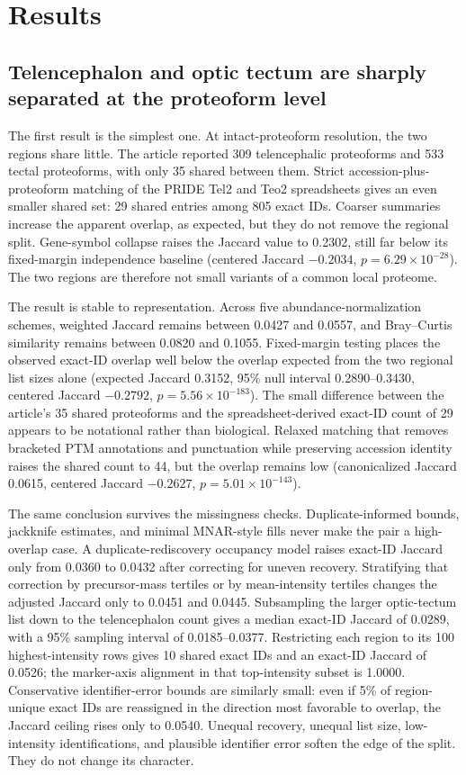 \section{Results}

\subsection{Telencephalon and optic tectum are sharply separated at the proteoform level}

The first result is the simplest one. At intact-proteoform resolution, the two regions share little. The article reported 309 telencephalic proteoforms and 533 tectal proteoforms, with only 35 shared between them. Strict accession-plus-proteoform matching of the PRIDE Tel2 and Teo2 spreadsheets gives an even smaller shared set: 29 shared entries among 805 exact IDs. Coarser summaries increase the apparent overlap, as expected, but they do not remove the regional split. Gene-symbol collapse raises the Jaccard value to 0.2302, still far below its fixed-margin independence baseline (centered Jaccard $-0.2034$, $p = 6.29 \times 10^{-28}$). The two regions are therefore not small variants of a common local proteome.

The result is stable to representation. Across five abundance-normalization schemes, weighted Jaccard remains between 0.0427 and 0.0557, and Bray--Curtis similarity remains between 0.0820 and 0.1055. Fixed-margin testing places the observed exact-ID overlap well below the overlap expected from the two regional list sizes alone (expected Jaccard 0.3152, 95\% null interval 0.2890--0.3430, centered Jaccard $-0.2792$, $p = 5.56 \times 10^{-183}$). The small difference between the article's 35 shared proteoforms and the spreadsheet-derived exact-ID count of 29 appears to be notational rather than biological. Relaxed matching that removes bracketed PTM annotations and punctuation while preserving accession identity raises the shared count to 44, but the overlap remains low (canonicalized Jaccard 0.0615, centered Jaccard $-0.2627$, $p = 5.01 \times 10^{-143}$).

The same conclusion survives the missingness checks. Duplicate-informed bounds, jackknife estimates, and minimal MNAR-style fills never make the pair a high-overlap case. A duplicate-rediscovery occupancy model raises exact-ID Jaccard only from 0.0360 to 0.0432 after correcting for uneven recovery. Stratifying that correction by precursor-mass tertiles or by mean-intensity tertiles changes the adjusted Jaccard only to 0.0451 and 0.0445. Subsampling the larger optic-tectum list down to the telencephalon count gives a median exact-ID Jaccard of 0.0289, with a 95\% sampling interval of 0.0185--0.0377. Restricting each region to its 100 highest-intensity rows gives 10 shared exact IDs and an exact-ID Jaccard of 0.0526; the marker-axis alignment in that top-intensity subset is 1.0000. Conservative identifier-error bounds are similarly small: even if 5\% of region-unique exact IDs are reassigned in the direction most favorable to overlap, the Jaccard ceiling rises only to 0.0540. Unequal recovery, unequal list size, low-intensity identifications, and plausible identifier error soften the edge of the split. They do not change its character.

